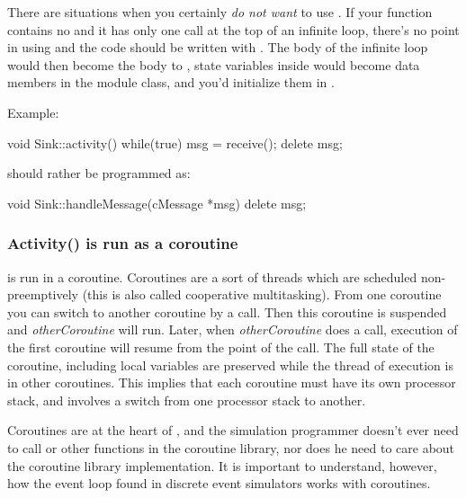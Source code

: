 There are situations when you certainly \textit{do not want} to use .
If your  function contains no  and it has
only one  call at the top of an infinite loop,
there's no point in using  and the code should be written
with .
The body of the infinite loop would then become the body to ,
state variables inside  would become data members in
the module class, and you'd initialize them in .

Example:

\begin{cpp}
void Sink::activity()
{
    while(true)
    {
        msg = receive();
        delete msg;
    }
}
\end{cpp}

should rather be programmed as:

\begin{cpp}
void Sink::handleMessage(cMessage *msg)
{
    delete msg;
}
\end{cpp}



\subsubsection{Activity() is run as a coroutine}


 is run in a coroutine.
Coroutines are a sort of threads which are scheduled
non-preemptively (this is also called cooperative
multitasking). From one coroutine you
can switch to another coroutine by a
 call. Then this
coroutine is suspended and \textit{otherCoroutine} will run. Later,
when \textit{otherCoroutine} does a
 call, execution of
the first coroutine will resume from the point of the
 call.  The full state
of the coroutine, including local variables are preserved while the
thread of execution is in other coroutines.  This implies that each
coroutine must have its own processor stack, and
 involves a switch from one processor stack to
another.


Coroutines are at the heart of {\opp}, and the
simulation programmer doesn't ever need to call 
or other functions in the coroutine library, nor does he need to care
about the coroutine library implementation. It is important to
understand, however, how the event loop found in discrete event simulators
works with coroutines.


